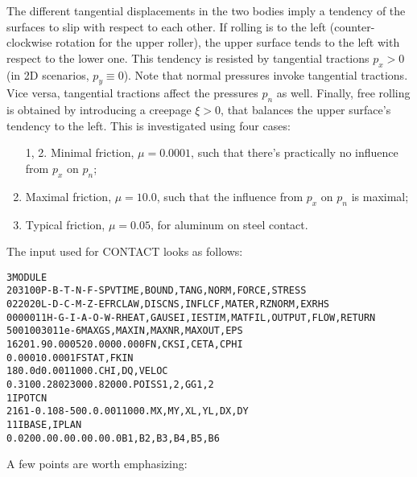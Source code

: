 \documentclass[12pt]{report}
\begin{document}
The different tangential displacements in the two bodies imply a tendency
of the surfaces to slip with respect to each other. If rolling is to the
left (counter-clockwise rotation for the upper roller), the upper surface
tends to the left with respect to the lower one. This tendency is
resisted by tangential tractions $p_x>0$ (in 2D scenarios, $p_y\equiv
0$). Note that normal pressures invoke tangential tractions. Vice versa,
tangential tractions affect the pressures $p_n$ as well. Finally, free
rolling is obtained by introducing a creepage $\xi>0$, that balances the
upper surface's tendency to the left. This is investigated using four cases:
\begin{enumerate}
\item[1, 2.] Minimal friction, $\mu=0.0001$, such that there's practically no
        influence from $p_x$ on $p_n$;
\setcounter{enumi}{2}
\item Maximal friction, $\mu=10.0$, such that the influence from $p_x$
        on $p_n$ is maximal;
\item Typical friction, $\mu=0.05$, for aluminum on steel contact.
\end{enumerate}
The input used for CONTACT looks as follows:
\begin{alltt}\small
 3 MODULE
  203100     P-B-T-N-F-S        PVTIME, BOUND , TANG  , NORM , FORCE, STRESS
  022020     L-D-C-M-Z-E        FRCLAW, DISCNS, INFLCF, MATER, RZNORM, EXRHS
 0000011   H-G-I-A-O-W-R  HEAT, GAUSEI, IESTIM, MATFIL, OUTPUT, FLOW, RETURN
   500   100    30      1     1e-6      MAXGS , MAXIN , MAXNR , MAXOUT, EPS
   16201.9  0.00052   0.000   0.000            FN, CKSI, CETA, CPHI
   0.0001   0.0001                             FSTAT, FKIN
   180.0d   0.001     1000.                    CHI, DQ, VELOC
   0.310    0.280    23000.   82000.           POISS 1,2,  GG 1,2
   1                                           IPOTCN
 216   1   -0.108    -500.    0.001    1000.   MX,MY,XL,YL,DX,DY
   1   1                                       IBASE, IPLAN
   0.020   0.0   0.0   0.0   0.0   0.0         B1,B2,B3,B4,B5,B6
\end{alltt}
A few points are worth emphasizing:
\end{document}
